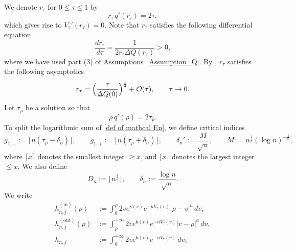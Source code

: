 \documentclass[reqno]{amsart}
\newcommand{\1}{\mathds{1}}
\numberwithin{equation}{section}
\theoremstyle{definition}
\begin{document}
We denote $r_{\tau}$ for $0\leq \tau\leq 1$ by
\begin{equation}
\label{def of rtau equation}
    r_{\tau}\,q'(r_{\tau})=2\tau,
\end{equation}
which gives rise to $V_{\tau}'(r_{\tau})=0$. 
Note that $r_{\tau}$ satisfies the following differential equation \cite[Eq. (2.6)]{BKS2023}
\begin{equation}
\label{def of rtau ODE}
\frac{dr_{\tau}}{d\tau}=\frac{1}{2r_{\tau}\Delta Q(r_{\tau})}>0,
\end{equation}
where we have used part (3) of Assumptions~\ref{Assumption_Q}.
By \cite[Eq. (3.7)]{BKS2023}, $r_{\tau}$ satisfies the following asymptotics
\begin{equation}
\label{def of rtau to 0}
    r_{\tau}=\Bigl(\frac{\tau}{\Delta Q(0)}\Bigr)^{\frac{1}{2}}+\mathcal{O}(\tau),\qquad \tau\to0. 
\end{equation}
Let $\tau_{\rho}$ be a solution so that 
\begin{equation}
\label{def of tau rho}
    \rho \,q'(\rho)=2\tau_{\rho}. 
\end{equation}
To split the logarithmic sum of \eqref{def of mathcal En}, we define critical indices 
\begin{equation}
\label{def of critical indices}
    g_{1,-}:=\lceil n(\tau_{\rho}-\delta_n) \rceil,\qquad
    g_{1,+}:=\lfloor n(\tau_{\rho}+\delta_n) \rfloor, \qquad 
    \delta_n':=\frac{M}{\sqrt{n}},\qquad M:=n^{\frac{1}{8}}(\log n)^{-\frac{1}{8}},
\end{equation}
where $\lceil x\rceil$ denotes the smallest integer $\geq x$, and $\lfloor x\rfloor$ denotes the largest integer $\leq x$.
We also define 
\begin{equation*}
    D_n:=\lfloor n^{\frac{1}{6}}\rfloor,\qquad\delta_n:=\frac{\log n}{\sqrt{n}}.
\end{equation*}
We write 
\begin{align}\label{def of hnj in}
h_{n,j}^{(\mathrm{in})}(\rho)&:=
\int_0^{\rho} 2ve^{\mathsf{k}(v)}e^{-nV_{\tau}(v)}|\rho-v|^{a}\,dv, 
\\
\label{def of hnj out}
h_{n,j}^{(\mathrm{out})}(\rho)&:=\int_{\rho}^{+\infty} 2ve^{\mathsf{k}(v)}e^{-nV_{\tau}(v)}|v-\rho|^{a}\,dv, 
\\
h_{n,j}&:=\int_0^{+\infty} 2ve^{\mathsf{k}(v)}e^{-nV_{\tau}(v)}\,dv,
\end{align}
\end{document}
